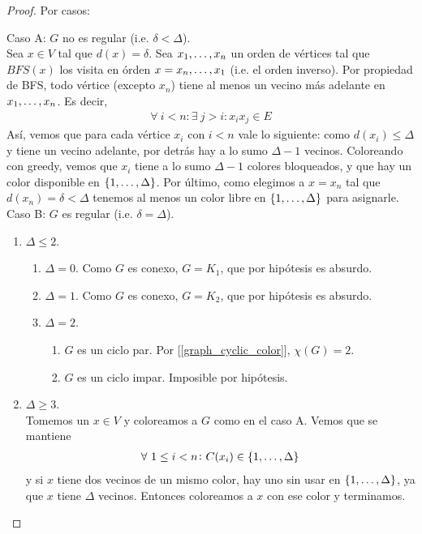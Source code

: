 \begin{proof}
Por casos:

Caso A: $G$ no es regular (i.e. $\delta < \Delta$).\\
Sea $x \in V$ tal que $d(x) = \delta$. Sea $x_1, \mathellipsis, x_n$ un orden de vértices tal que $BFS(x)$ los visita en órden $x = x_n, \mathellipsis, x_1$ (i.e. el orden inverso). Por propiedad de BFS, todo vértice (excepto $x_n$) tiene al menos un vecino más adelante en $x_1, \mathellipsis, x_n$. Es decir,
    \begin{align}
        \forall~ i < n \colon \exists~ j > i \colon x_ix_j \in E    
    \end{align}
Así, vemos que para cada vértice $x_i$ con $i < n$ vale lo siguiente: como $d(x_i) \le \Delta$ y tiene un vecino adelante, por detrás hay a lo sumo $\Delta - 1$ vecinos. Coloreando con greedy, vemos que $x_i$ tiene a lo sumo $\Delta - 1$ colores bloqueados, y que hay un color disponible en $\{1, \mathellipsis, \Delta\}$. Por último, como elegimos a $x = x_n$ tal que $d(x_n) = \delta < \Delta$ tenemos al menos un color libre en $\{1, \mathellipsis, \Delta\}$ para asignarle.\\

Caso B: $G$ es regular (i.e. $\delta = \Delta$).
\begin{enumerate}
    \item $\Delta \le 2$.
    \begin{enumerate}
        \item $\Delta = 0$. Como $G$ es conexo, $G = K_1$, que por hipótesis es absurdo.
        \item $\Delta = 1$. Como $G$ es conexo, $G = K_2$, que por hipótesis es absurdo.
        \item $\Delta = 2$.
        \begin{enumerate}
            \item $G$ es un ciclo par. Por [\ref{graph_cyclic_color}], $\chi(G) = 2$.
            \item $G$ es un ciclo impar. Imposible por hipótesis.
        \end{enumerate}
    \end{enumerate}

    \item $\Delta \ge 3$.\\
    Tomemos un $x \in V$ y coloreamos a $G$ como en el caso A. Vemos que se mantiene
    \begin{align}
        \forall~ 1 \le i < n \colon C(x_i) \in \{1, \mathellipsis, \Delta\}
    \end{align}
    y si $x$ tiene dos vecinos de un mismo color, hay uno sin usar en $\{1, \mathellipsis, \Delta\}$, ya que $x$ tiene $\Delta$ vecinos. Entonces coloreamos a $x$ con ese color y terminamos.


\end{enumerate}
\end{proof}

